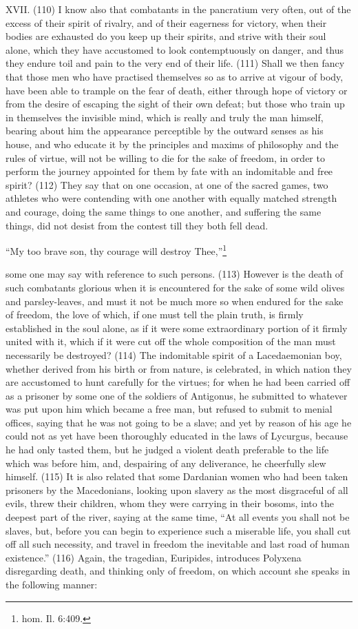 XVII. (110) I know also that combatants in the pancratium very often, out of the excess of their
spirit of rivalry, and of their eagerness for victory, when their bodies are exhausted do you keep up
their spirits, and strive with their soul alone, which they have accustomed to look contemptuously
on danger, and thus they endure toil and pain to the very end of their life. (111) Shall we then fancy
that those men who have practised themselves so as to arrive at vigour of body, have been able to
trample on the fear of death, either through hope of victory or from the desire of escaping the sight
of their own defeat; but those who train up in themselves the invisible mind, which is really and truly
the man himself, bearing about him the appearance perceptible by the outward senses as his
house, and who educate it by the principles and maxims of philosophy and the rules of virtue, will
not be willing to die for the sake of freedom, in order to perform the journey appointed for them by
fate with an indomitable and free spirit? (112) They say that on one occasion, at one of the sacred
games, two athletes who were contending with one another with equally matched strength and
courage, doing the same things to one another, and suffering the same things, did not desist from
the contest till they both fell dead.

``My too brave son, thy courage will destroy Thee,''\footnote{hom. Il. 6:409.}

some one may say with reference to such persons. (113) However is the death of such
combatants glorious when it is encountered for the sake of some wild olives and parsley-leaves,
and must it not be much more so when endured for the sake of freedom, the love of which, if one
must tell the plain truth, is firmly established in the soul alone, as if it were some extraordinary
portion of it firmly united with it, which if it were cut off the whole composition of the man must
necessarily be destroyed? (114) The indomitable spirit of a Lacedaemonian boy, whether derived
from his birth or from nature, is celebrated, in which nation they are accustomed to hunt carefully
for the virtues; for when he had been carried off as a prisoner by some one of the soldiers of
Antigonus, he submitted to whatever was put upon him which became a free man, but refused to
submit to menial offices, saying that he was not going to be a slave; and yet by reason of his age
he could not as yet have been thoroughly educated in the laws of Lycurgus, because he had only
tasted them, but he judged a violent death preferable to the life which was before him, and,
despairing of any deliverance, he cheerfully slew himself. (115) It is also related that some
Dardanian women who had been taken prisoners by the Macedonians, looking upon slavery as the
most disgraceful of all evils, threw their children, whom they were carrying in their bosoms, into the
deepest part of the river, saying at the same time, ``At all events you shall not be slaves, but, before
you can begin to experience such a miserable life, you shall cut off all such necessity, and travel in
freedom the inevitable and last road of human existence.'' (116) Again, the tragedian, Euripides,
introduces Polyxena disregarding death, and thinking only of freedom, on which account she
speaks in the following manner:

